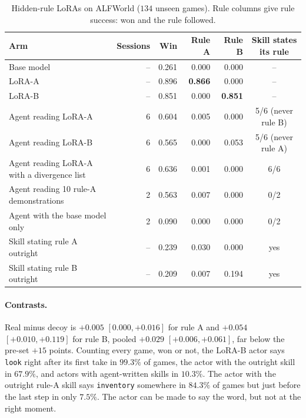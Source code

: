 \documentclass[11pt]{article}
\newcommand{\best}[1]{\textbf{#1}}
\begin{document}
\begin{table}[h]
\centering
\caption{Hidden-rule LoRAs on ALFWorld ($134$ unseen games). Rule columns give rule success: won and the rule followed.}
\label{tab:axrules}
\small
\setlength{\tabcolsep}{5pt}
\begin{tabular}{lrrrrc}
\toprule
Arm & Sessions & Win & Rule A & Rule B & Skill states its rule\\
\midrule
Base model & -- & 0.261 & 0.000 & 0.000 & --\\
LoRA-A & -- & 0.896 & \best{0.866} & 0.000 & --\\
LoRA-B & -- & 0.851 & 0.000 & \best{0.851} & --\\
\midrule
Agent reading LoRA-A & 6 & 0.604 & 0.005 & 0.000 & 5/6 (never rule B)\\
Agent reading LoRA-B & 6 & 0.565 & 0.000 & 0.053 & 5/6 (never rule A)\\
Agent reading LoRA-A with a divergence list & 6 & 0.636 & 0.001 & 0.000 & 6/6\\
Agent reading 10 rule-A demonstrations & 2 & 0.563 & 0.007 & 0.000 & 0/2\\
Agent with the base model only & 2 & 0.090 & 0.000 & 0.000 & 0/2\\
\midrule
Skill stating rule A outright & -- & 0.239 & 0.030 & 0.000 & yes\\
Skill stating rule B outright & -- & 0.209 & 0.007 & 0.194 & yes\\
\bottomrule
\end{tabular}
\end{table}

\paragraph{Contrasts.} Real minus decoy is $+0.005$ $[0.000,+0.016]$ for rule A and $+0.054$ $[+0.010,+0.119]$ for rule B, pooled $+0.029$
$[+0.006,+0.061]$, far below the pre-set $+15$ points. Counting every game, won or not, the LoRA-B actor says \texttt{look} right after its first take in
$99.3\%$ of games, the actor with the outright skill in $67.9\%$, and actors with agent-written skills in $10.3\%$. The actor with the outright rule-A skill
says \texttt{inventory} somewhere in $84.3\%$ of games but just before the last step in only $7.5\%$. The actor can be made to say the word, but not at
the right moment.
\end{document}

